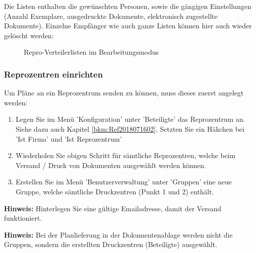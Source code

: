 Die Listen enthalten die gewünschten Personen, sowie die gängigen Einstellungen (Anzahl Exemplare, ausgedruckte Dokumente, elektronisch zugestellte Dokumente). Einzelne Empfänger wie auch ganze Listen können hier auch wieder gelöscht werden:

\begin{figure}[H]
\caption{Repro-Verteilerlisten im Bearbeitungsmodus}
\end{figure}

\subsubsection{Reprozentren einrichten}
\label{bkm:Ref2018071601}

Um Pläne an ein Reprozentrum senden zu können, muss dieses zuerst angelegt werden:

\begin{enumerate}
\item Legen Sie im Menü 'Konfiguration' unter 'Beteiligte' das Reprozentrum an. Siehe dazu auch Kapitel \ref{bkm:Ref2018071602}. Setzten Sie ein Häkchen bei 'Ist Firma' und 'Ist Reprozentrum'
\item Wiederholen Sie obigen Schritt für sämtliche Reprozentren, welche beim Versand / Druck von Dokumenten ausgewählt werden können.
\item Erstellen Sie im Menü 'Benutzerverwaltung' unter 'Gruppen' eine neue Gruppe, welche sämtliche Druckzentren (Punkt 1 und 2) enthält.
\end{enumerate}

\textbf{Hinweis:} Hinterlegen Sie eine gültige Emailadresse, damit der Versand funktioniert.

\vspace{\baselineskip}

\textbf{Hinweis:} Bei der Planlieferung in der Dokumentenablage werden nicht die Gruppen, sondern die erstellten Druckzentren (Beteiligte) ausgewählt.

